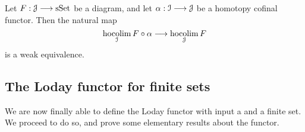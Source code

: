     \begin{lem}\label{lem_homotopy_cofinal_functor_and_hocolim}\cite[Thm.
      19.6.7]{hirschhorn2009model}
      Let $F: \mathcal{J} \longrightarrow \mathrm{sSet}$ be a diagram, and let $\alpha: \mathcal{I} \longrightarrow \mathcal{J}$ be a
      homotopy cofinal functor. Then the natural map
      \begin{displaymath}
        \operatorname*{hocolim}_{\mathcal{I}} F \circ \alpha \longrightarrow \operatorname*{hocolim}_{\mathcal{J}} F
      \end{displaymath}
      is a weak equivalence.
    \end{lem}
  \subsection{The Loday functor for finite sets}
    We are now finally able to define the Loday functor with input a \hring and
    a finite set. We proceed to do so, and prove some elementary results about
    the functor.
